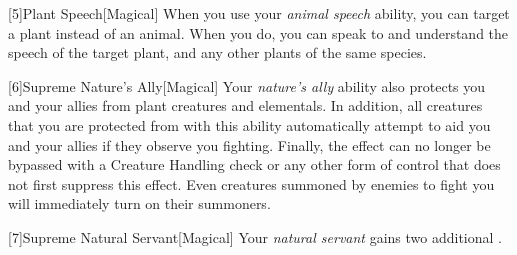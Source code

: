         [5]{Plant Speech}[Magical] When you use your \textit{animal speech} ability, you can target a plant instead of an animal.
        When you do, you can speak to and understand the speech of the target plant, and any other plants of the same species.

        [6]{Supreme Nature's Ally}[Magical] Your \textit{nature's ally} ability also protects you and your allies from plant creatures and elementals.
        In addition, all creatures that you are protected from with this ability automatically attempt to aid you and your allies if they observe you fighting.
        Finally, the effect can no longer be bypassed with a Creature Handling check or any other form of control that does not first suppress this effect.
        Even creatures summoned by enemies to fight you will immediately turn on their summoners.

        [7]{Supreme Natural Servant}[Magical] Your \textit{natural servant} gains two additional .

